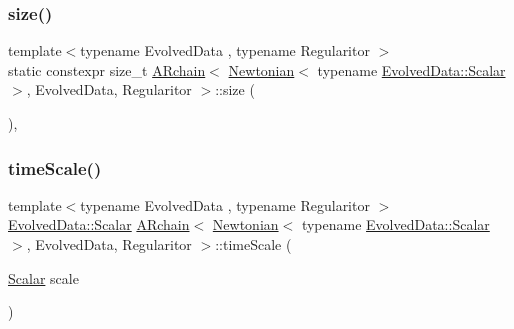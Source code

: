\subsubsection{\texorpdfstring{size()}{size()}}
{\footnotesize\ttfamily template$<$typename Evolved\+Data , typename Regularitor $>$ \\
static constexpr size\+\_\+t \mbox{\hyperlink{class_a_rchain}{A\+Rchain}}$<$ \mbox{\hyperlink{class_newtonian}{Newtonian}}$<$ typename \mbox{\hyperlink{class_a_rchain_a707e42a79e4744424a34c9007e84ee07}{Evolved\+Data\+::\+Scalar}} $>$, Evolved\+Data, Regularitor $>$\+::size (\begin{DoxyParamCaption}{ }\end{DoxyParamCaption})\hspace{0.3cm}{\ttfamily [inline]}, {\ttfamily [static]}}

\mbox{\label{class_a_rchain_3_01_newtonian_3_01typename_01_evolved_data_1_1_scalar_01_4_00_01_evolved_data_00_01_regularitor_01_4_aa7aadb0b5ffcfebc759e4f091c4fc763}} 
\subsubsection{\texorpdfstring{time\+Scale()}{timeScale()}}
{\footnotesize\ttfamily template$<$typename Evolved\+Data , typename Regularitor $>$ \\
\mbox{\hyperlink{class_a_rchain_a707e42a79e4744424a34c9007e84ee07}{Evolved\+Data\+::\+Scalar}} \mbox{\hyperlink{class_a_rchain}{A\+Rchain}}$<$ \mbox{\hyperlink{class_newtonian}{Newtonian}}$<$ typename \mbox{\hyperlink{class_a_rchain_a707e42a79e4744424a34c9007e84ee07}{Evolved\+Data\+::\+Scalar}} $>$, Evolved\+Data, Regularitor $>$\+::time\+Scale (\begin{DoxyParamCaption}\item[{\mbox{\hyperlink{class_a_rchain_3_01_newtonian_3_01typename_01_evolved_data_1_1_scalar_01_4_00_01_evolved_data_00_01_regularitor_01_4_a2c77dc1b58a25ac5c6ee95dd7809f693}{Scalar}}}]{scale }\end{DoxyParamCaption})}

